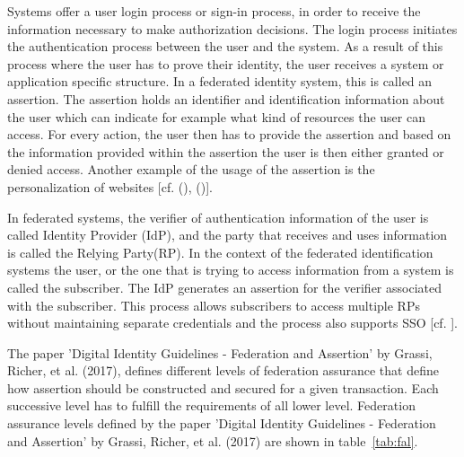 Systems offer a user login process or sign-in process, in order to receive the information necessary to make authorization decisions. The login process initiates the authentication process between the user and the system. As a result of this process where the user has to prove their identity, the user receives a system or application specific structure. In a federated identity system, this is called an assertion. The assertion holds an identifier and identification information about the user which can indicate for example what kind of resources the user can access. For every action, the user then has to provide the assertion and based on the information provided within the assertion the user is then either granted or denied access. Another example of the usage of the assertion is the personalization of websites [cf. (\cite{Todorov:2007:MUI}), (\cite{NIST:2017:DIG})].

In federated systems, the verifier of authentication information of the user is called Identity Provider (IdP), and the party that receives and uses information is called the Relying Party(RP). In the context of the federated identification systems the user, or the one that is trying to access information from a system is called the subscriber. The IdP generates an assertion for the verifier associated with the subscriber. This process allows subscribers to access multiple RPs without maintaining separate credentials and the process also supports SSO [cf. \cite{NIST:2017:DIGFA}].

The paper 'Digital Identity Guidelines - Federation and Assertion' by Grassi, Richer, et al. (2017), defines different levels of federation assurance that define how assertion should be constructed and secured for a given transaction. Each successive level has to fulfill the requirements of all lower level. Federation assurance levels defined by the paper 'Digital Identity Guidelines - Federation and Assertion' by Grassi, Richer, et al.  (2017) are shown in table~\ref{tab:fal}.



